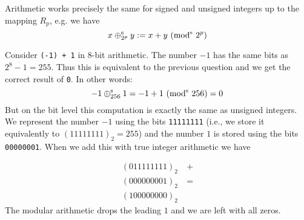 Arithmetic works precisely the same for signed and unsigned integers up to the mapping $R_p$, e.g. we have
\[
x \ensuremath{\oplus}_{2^p}^{\rm s} y := x + y\ ({\rm mod}^{\rm s}\ 2^p)
\]
\begin{example} Consider \texttt{(-1) + 1} in 8-bit arithmetic. The number $-1$ has the same bits as $2^8 - 1 = 255$. Thus this is equivalent to the previous question and we get the correct result of \texttt{0}. In other words:
\[
-1 \ensuremath{\oplus}_{256}^{\rm s} 1 = -1 + 1 \ ({\rm mod}^{\rm s}\ 256) = 0
\]
But on the bit level this computation is exactly the same as unsigned integers. We represent the number $-1$ using the bits \texttt{11111111} (i.e., we store it equivalently to  $(11111111)_2 = 255$) and the  number $1$ is stored using the bits \texttt{00000001}. When we add this with true integer arithmetic we have


\begin{align*}
(0 11111111)_2 &\ + \\
(0 00000001)_2 &\ = \\
(1 00000000)_2&
\end{align*}
The modular arithmetic drops the leading $1$ and we are left with all zeros.

\end{example}

